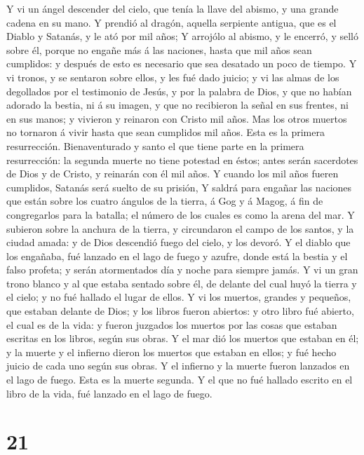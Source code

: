  Y vi un ángel descender del cielo, que tenía la llave del
abismo, y una grande cadena en su mano.  Y prendió al
dragón, aquella serpiente antigua, que es el Diablo y Satanás, y le ató
por mil años;  Y arrojólo al abismo, y le encerró, y selló
sobre él, porque no engañe más á las naciones, hasta que mil años sean
cumplidos: y después de esto es necesario que sea desatado un poco de
tiempo.  Y vi tronos, y se sentaron sobre ellos, y les fué
dado juicio; y vi las almas de los degollados por el testimonio de
Jesús, y por la palabra de Dios, y que no habían adorado la bestia, ni á
su imagen, y que no recibieron la señal en sus frentes, ni en sus manos;
y vivieron y reinaron con Cristo mil años.  Mas los otros
muertos no tornaron á vivir hasta que sean cumplidos mil años. Esta es
la primera resurrección.  Bienaventurado y santo el que
tiene parte en la primera resurrección: la segunda muerte no tiene
potestad en éstos; antes serán sacerdotes de Dios y de Cristo, y
reinarán con él mil años.  Y cuando los mil años fueren
cumplidos, Satanás será suelto de su prisión,  Y saldrá
para engañar las naciones que están sobre los cuatro ángulos de la
tierra, á Gog y á Magog, á fin de congregarlos para la batalla; el
número de los cuales es como la arena del mar.  Y subieron
sobre la anchura de la tierra, y circundaron el campo de los santos, y
la ciudad amada: y de Dios descendió fuego del cielo, y los devoró.
 Y el diablo que los engañaba, fué lanzado en el lago de
fuego y azufre, donde está la bestia y el falso profeta; y serán
atormentados día y noche para siempre jamás.  Y vi un
gran trono blanco y al que estaba sentado sobre él, de delante del cual
huyó la tierra y el cielo; y no fué hallado el lugar de ellos.
 Y vi los muertos, grandes y pequeños, que estaban
delante de Dios; y los libros fueron abiertos: y otro libro fué abierto,
el cual es de la vida: y fueron juzgados los muertos por las cosas que
estaban escritas en los libros, según sus obras.  Y el
mar dió los muertos que estaban en él; y la muerte y el infierno dieron
los muertos que estaban en ellos; y fué hecho juicio de cada uno según
sus obras.  Y el infierno y la muerte fueron lanzados en
el lago de fuego. Esta es la muerte segunda.  Y el que no
fué hallado escrito en el libro de la vida, fué lanzado en el lago de
fuego.

\hypertarget{section-20}{%
\section{21}\label{section-20}}


